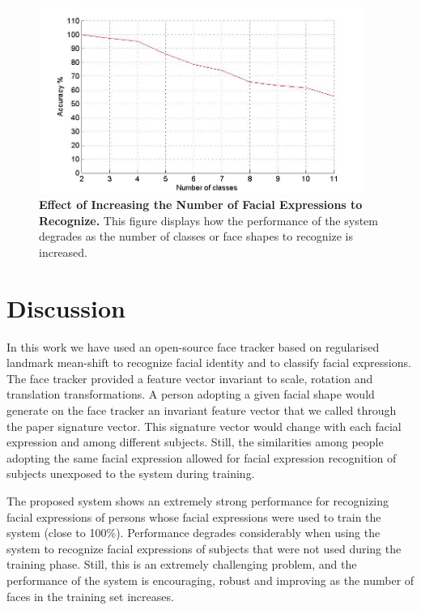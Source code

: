 \documentclass[]{article}
\begin{document}
\begin{figure}[ht]
\begin{center}
\vspace{-3mm}
\includegraphics[width=0.95\textwidth]{figures/50people_increasing_classes.jpg}
\end{center}
\caption{\textbf{Effect of Increasing the Number of Facial Expressions to Recognize.} This figure displays how the 
performance of the system degrades as the number of classes or face shapes to recognize is increased. }
\label{increasingNumberExpressions}
\end{figure}






\section{Discussion}
In this work we have used an open-source face tracker based on regularised landmark mean-shift to recognize facial
identity and to classify facial expressions. The face tracker provided a feature vector invariant to scale, rotation and
translation transformations. A person adopting a given facial shape would generate on the face tracker an invariant
feature vector that we called through the paper signature vector. This signature vector would change with each facial
expression  and among different subjects. Still, the similarities among people adopting the same facial expression 
allowed for facial expression recognition of subjects unexposed to the system during training.


The proposed system shows an extremely strong performance for recognizing facial expressions of persons whose facial
expressions were used to train the system (close to 100\%). Performance degrades considerably when using the system to
recognize facial expressions of subjects that were not used during the training phase. Still, this is an extremely
challenging problem, and the performance of the system is encouraging, robust and improving as the number of faces
in the training set increases.
\end{document}
